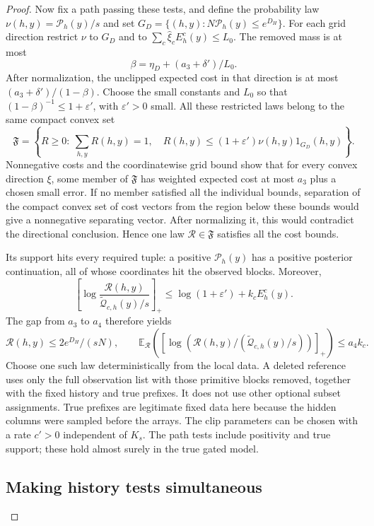 \begin{proof}
Now fix a path passing these tests, and define the probability law
\(\nu(h,y)=\mathcal P_h(y)/s\) and set
\(G_D=\{(h,y):N\mathcal P_h(y)\le e^{D_H}\}\). For each grid direction
restrict \(\nu\) to \(G_D\) and to
\(\sum_c\widehat\xi_cE_h^c(y)\le L_0\). The removed mass is at most
\[
 \beta=\eta_D+(a_3+\delta')/L_0.
\]
After normalization, the unclipped expected cost in that direction is
at most \((a_3+\delta')/(1-\beta)\). Choose the small constants and
\(L_0\) so that \((1-\beta)^{-1}\le1+\varepsilon'\), with
\(\varepsilon'>0\) small. All these restricted laws belong to the same
compact convex set
\[
 \mathfrak F=\left\{R\ge0:\ \sum_{h,y}R(h,y)=1,\quad
 R(h,y)\le(1+\varepsilon')\nu(h,y)1_{G_D}(h,y)\right\}.
\]
Nonnegative costs and the coordinatewise grid bound show that for every
convex direction \(\xi\), some member of \(\mathfrak F\) has weighted
expected cost at most \(a_3\) plus a chosen small error. If no member
satisfied all the individual bounds, separation of the compact convex
set of cost vectors from the region below these bounds would give a
nonnegative separating vector. After normalizing it, this would contradict
the directional conclusion. Hence one law \(\mathcal R\in\mathfrak F\)
satisfies all the cost bounds.

Its support hits every required tuple: a positive \(\mathcal P_h(y)\)
has a positive posterior continuation, all of whose coordinates hit the
observed blocks. Moreover,
\[
 \left[\log\frac{\mathcal R(h,y)}
   {\widetilde{\mathcal Q}_{c,h}(y)/s}\right]_+
 \le \log(1+\varepsilon')+k_c E_h^c(y).
\]
The gap from \(a_3\) to \(a_4\) therefore yields
\[
 \mathcal R(h,y)\le 2e^{D_H}/(sN),\qquad
 \mathbb E_{\mathcal R}\!\left(
  [\log(\mathcal R(h,y)/(\widetilde{\mathcal Q}_{c,h}(y)/s))]_+
                         \right)\le a_4k_c.
\]
Choose one such law deterministically from the local data. A deleted
reference uses only the full observation list with those primitive blocks
removed, together with the fixed history and true prefixes. It does not
use other optional subset assignments. True prefixes are legitimate fixed
data here because the hidden columns were sampled before the arrays.
The clip parameters can be chosen with a rate \(c'>0\) independent of
\(K_s\). The path tests include positivity and true support; these hold
almost surely in the true gated model.

\subsection{Making history tests simultaneous}
\label{sec:making-history-tests-simultaneous}


\end{proof}
